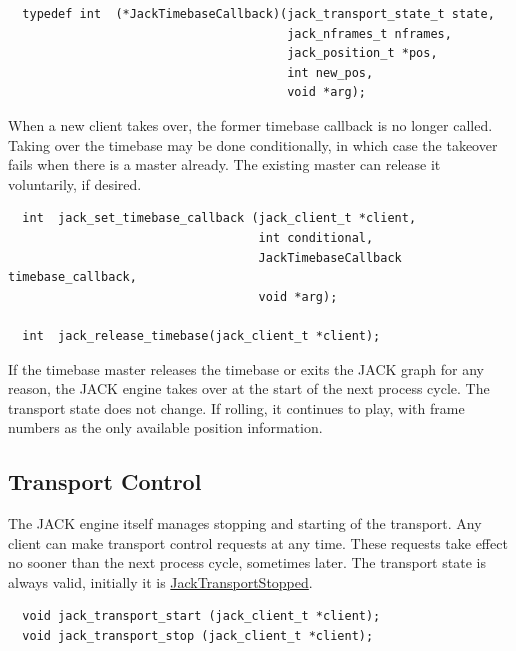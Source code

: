 \footnotesize\begin{verbatim}  typedef int  (*JackTimebaseCallback)(jack_transport_state_t state,
                                       jack_nframes_t nframes,
                                       jack_position_t *pos,
                                       int new_pos,
                                       void *arg);
\end{verbatim}
\normalsize


When a new client takes over, the former timebase callback is no longer called. Taking over the timebase may be done conditionally, in which case the takeover fails when there is a master already. The existing master can release it voluntarily, if desired.



\footnotesize\begin{verbatim}  int  jack_set_timebase_callback (jack_client_t *client,
                                   int conditional,
                                   JackTimebaseCallback timebase_callback,
                                   void *arg);

  int  jack_release_timebase(jack_client_t *client);
\end{verbatim}
\normalsize


If the timebase master releases the timebase or exits the JACK graph for any reason, the JACK engine takes over at the start of the next process cycle. The transport state does not change. If rolling, it continues to play, with frame numbers as the only available position information.\hypertarget{transport-design_transportcontrol}{}\subsection{Transport Control}\label{transport-design_transportcontrol}
The JACK engine itself manages stopping and starting of the transport. Any client can make transport control requests at any time. These requests take effect no sooner than the next process cycle, sometimes later. The transport state is always valid, initially it is \hyperlink{transport_8h_499ffea77b03cce9c647d7b5065f733866566fe3891dbba7d3cdda2b7fef1793}{Jack\-Transport\-Stopped}.



\footnotesize\begin{verbatim}  void jack_transport_start (jack_client_t *client);
  void jack_transport_stop (jack_client_t *client);
\end{verbatim}
\normalsize


